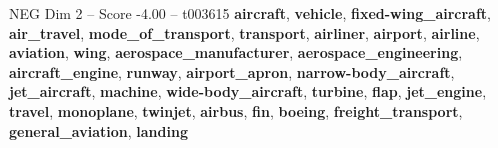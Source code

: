 \begin{textsample}{NEG Dim 2 – Score -4.00 – t003615}  \label{ex:f2_neg_009}
\textbf{aircraft}, \textbf{vehicle}, \textbf{fixed-wing\_aircraft}, \textbf{air\_travel}, \textbf{mode\_of\_transport}, \textbf{transport}, \textbf{airliner}, \textbf{airport}, \textbf{airline}, \textbf{aviation}, \textbf{wing}, \textbf{aerospace\_manufacturer}, \textbf{aerospace\_engineering}, \textbf{aircraft\_engine}, \textbf{runway}, \textbf{airport\_apron}, \textbf{narrow-body\_aircraft}, \textbf{jet\_aircraft}, \textbf{machine}, \textbf{wide-body\_aircraft}, \textbf{turbine}, \textbf{flap}, \textbf{jet\_engine}, \textbf{travel}, \textbf{monoplane}, \textbf{twinjet}, \textbf{airbus}, \textbf{fin}, \textbf{boeing}, \textbf{freight\_transport}, \textbf{general\_aviation}, \textbf{landing}

\end{textsample}
